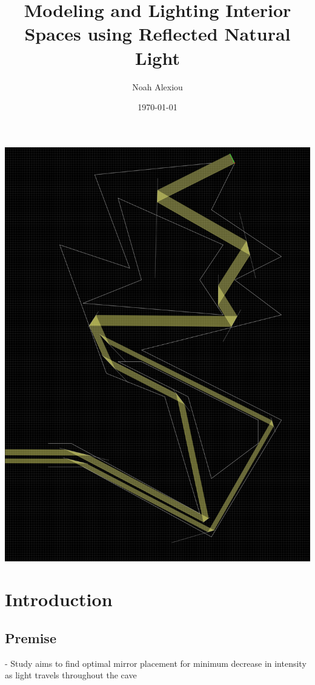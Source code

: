 \documentclass[11pt, letterpaper]{article}
\begin{document}
\begin{titlepage}
	\title{Modeling and Lighting Interior Spaces using Reflected Natural Light}
	\author{Noah Alexiou}
	\date{\today}
	
	\maketitle
	\centering
	\includegraphics[width=15cm]{Cave.png}
	
\end{titlepage}

\newpage
\tableofcontents


\newpage

\section{Introduction}


\subsection{Premise}
- Study aims to find optimal mirror placement for minimum decrease in intensity as light travels throughout the cave
\end{document}
